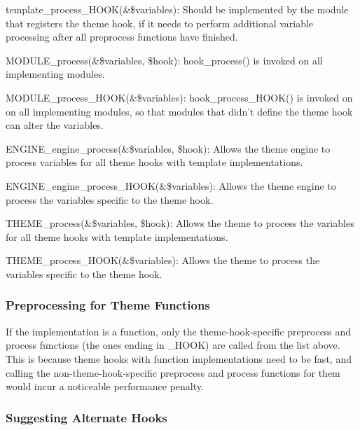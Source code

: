 \begin{DoxyItemize}
\item template\_\-process\_\-HOOK(\&\$variables): Should be implemented by the module that registers the theme hook, if it needs to perform additional variable processing after all preprocess functions have finished.
\item MODULE\_\-process(\&\$variables, \$hook): hook\_\-process() is invoked on all implementing modules.
\item MODULE\_\-process\_\-HOOK(\&\$variables): hook\_\-process\_\-HOOK() is invoked on on all implementing modules, so that modules that didn't define the theme hook can alter the variables.
\item ENGINE\_\-engine\_\-process(\&\$variables, \$hook): Allows the theme engine to process variables for all theme hooks with template implementations.
\item ENGINE\_\-engine\_\-process\_\-HOOK(\&\$variables): Allows the theme engine to process the variables specific to the theme hook.
\item THEME\_\-process(\&\$variables, \$hook): Allows the theme to process the variables for all theme hooks with template implementations.
\item THEME\_\-process\_\-HOOK(\&\$variables): Allows the theme to process the variables specific to the theme hook.
\end{DoxyItemize}\hypertarget{includes_2theme_8inc_sub_preprocess_theme_funcs}{}\subsubsection{Preprocessing for Theme Functions}\label{includes_2theme_8inc_sub_preprocess_theme_funcs}
If the implementation is a function, only the theme-\/hook-\/specific preprocess and process functions (the ones ending in \_\-HOOK) are called from the list above. This is because theme hooks with function implementations need to be fast, and calling the non-\/theme-\/hook-\/specific preprocess and process functions for them would incur a noticeable performance penalty.\hypertarget{includes_2theme_8inc_sub_alternate_suggestions}{}\subsubsection{Suggesting Alternate Hooks}\label{includes_2theme_8inc_sub_alternate_suggestions}
